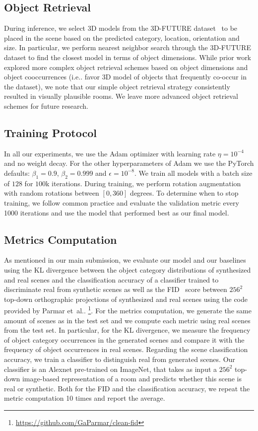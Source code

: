 \documentclass{article}
\makeatletter
\DeclareRobustCommand\onedot{\futurelet\@let@token\@onedot}
\def\@onedot{\ifx\@let@token.\else.\null\fi\xspace}
\def\ie{i.e\onedot} \def\Ie{I.e\onedot}
\def\etal{et~al\onedot}
\makeatother
\begin{document}
\subsection{Object Retrieval}
During inference, we select 3D models from the 3D-FUTURE
dataset~\cite{Fu2020ARXIVb} to be placed in the scene based on the predicted
category, location, orientation and size. In particular, we perform nearest
neighbor search through the 3D-FUTURE dataset\cite{Fu2020ARXIVb} to find the
closest model in terms of object dimensions. While prior work
\cite{Ritchie2019CVPR, Wang2020ARXIV} explored more complex object retrieval
schemes based on object dimensions and object cooccurrences (\ie favor 3D model
of objects that frequently co-occur in the dataset), we note that our simple
object retrieval strategy consistently resulted in visually
plausible rooms. We leave more advanced object retrieval schemes for future
research.

\subsection{Training Protocol}
In all our experiments, we use the Adam optimizer \cite{Kingma2015ICLR} with
learning rate $\eta=10^{-4}$ and no weight decay. For the other
hyperparameters of Adam we use the PyTorch defaults: $\beta_1=0.9$, $\beta_2 =
0.999$ and $\epsilon= 10^{-8}$. We train all models with a batch size of $128$
for $100$k iterations. During training, we perform rotation augmentation with
random rotations between $[0, 360]$ degrees.
To determine when to stop training, we follow common practice and evaluate the
validation metric every 1000 iterations and use the model that performed
best as our final model.

\subsection{Metrics Computation}\label{subsec:evaluation_metrics}
As mentioned in our main submission, we evaluate our model and our baselines using
the KL divergence between the object category distributions of synthesized
and real scenes and the classification accuracy of a
classifier trained to discriminate real from synthetic scenes as well as the
FID~\cite{Heusel2017NIPS} score between $256^2$
top-down orthographic projections of synthesized and real scenes using the code provided by Parmar \etal
\cite{Parmar2021ARXIV}\footnote{\href{https://github.com/GaParmar/clean-fid}{https://github.com/GaParmar/clean-fid}}.
For the metrics computation, we generate the same amount of
scenes as in the test set and we compute each metric using real scenes from the
test set. In particular, for the KL divergence,  we measure the frequency of object category
occurrences in the generated scenes and compare it with the frequency of
object occurrences in real scenes. Regarding the scene classification accuracy, we
train a classifier to distinguish real from generated scenes. Our classifier is
an Alexnet \cite{Krizhevsky2012NIPS} pre-trained on ImageNet, that takes as
input a $256^2$ top-down image-based representation of a room and predicts whether this
scene is real or synthetic. Both for the FID and the classification accuracy,
we repeat the metric computation 10 times and report the average.
\end{document}

